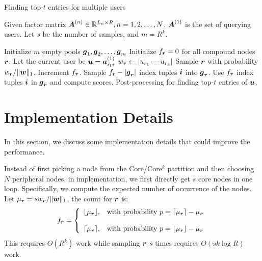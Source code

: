 \documentclass[letterpaper]{article}
\newcommand{\V}[1]{{\boldsymbol{{\MakeLowercase{#1}}}}}
\newcommand{\RowVecA}[1]{\V{a}^{(#1)}_{i_#1*}}
\newcommand{\M}[1]{{\boldsymbol{{\MakeUppercase{#1}}}}}
\newcommand{\FacMat}[2]{\M{#1}^{(#2)}}
\newcommand{\norm}[2]{\|#1\|_{#2}}
\begin{document}
\begin{algorithm}[!ht]
    \caption{Finding top-$t$ entries for multiple users}
    \label{alg:QuerySampling}
        Given factor matrix $\FacMat{A}{n}\in \mathbb{R}^{L_n\times R}, n = 1,2,\ldots,N$.
        $\FacMat{A}{1}$ is the set of querying users.
        Let $s$ be the number of samples, and $m=R^k$.
    \begin{algorithmic}[1]
    \State Initialize $m$ empty pools $\V{g}_1,\V{g}_2,\ldots,\V{g}_m$
    \State Initialize $f_{\V{r}} = 0$ for all compound nodes $\V{r}$.
    \State Let the current user be $\V{u}=\RowVecA{1}$
    \ForAll{$\V{r}=(r_1,\ldots,r_k)$}
    \State $w_\V{r} \leftarrow |u_{r_1}\cdots u_{r_k}|$
    \EndFor
    \State Sample $\V{r}$ with probability $w_\V{r}/\norm{\V{W}}{1}$.
    \label{line:Indexes}
    \State  Increment $f_{\V{r}}$.
    \EndFor
    \ForAll {$\V{r}$}
    \If {$f_\V{r} > |\V{g}_\V{r}|$ }
    \State Sample $f_{\V{r}} - |\V{g}_{\V{r}}|$ index tuples $\V{i}$ into $\V{g}_{\V{r}}$.
    \EndIf
    \State Use $f_{\V{r}}$ index tuples $\V{i}$ in $\V{g}_{\V{r}}$ and compute scores.
    \EndFor
    \State Post-processing for finding top-$t$ entries of $\V{u}$.
    \EndFor
    \end{algorithmic}
\end{algorithm}

\section{Implementation Details}
In this section, we discuss some implementation details that could improve the performance.

Instead of first picking a node from the Core/Core$^k$ partition
and then choosing $N$ peripheral nodes,
in implementation, we first directly get $s$ core nodes in one loop.
Specifically, we compute the expected number of occurrence of the nodes.
Let $\mu_{\V{r}}=sw_\V{r}/\norm{\V{w}}{1}$, the count for $\V{r}$ is:
\begin{equation}f_\V{r}=
    \left\{
      \begin{array}{ll}
        \lfloor \mu_{\V{r}} \rfloor,
        & \hbox {with probability $p=\lceil \mu_{\V{r}} \rceil - \mu_{\V{r}}$} \\\\
        \lceil \mu_{\V{r}} \rceil,
        & \hbox{with probability $p=\lfloor \mu_{\V{r}} \rfloor - \mu_{\V{r}}$}
      \end{array}
    \right.
\end{equation}
This requires $O(R^k)$ work while sampling $\V{r}$ $s$ times requires $O(sk\log R)$ work.
\end{document}
